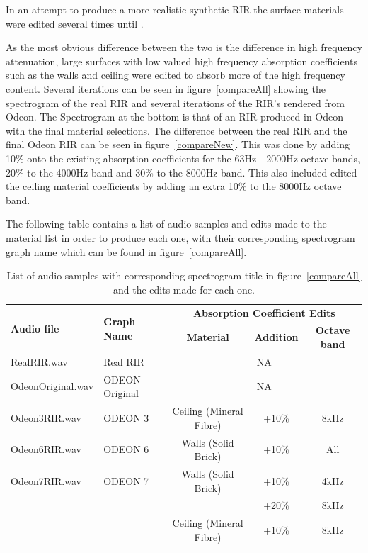 \documentclass[../../main.tex]{subfiles}
\begin{document}
			In an attempt to produce a more realistic synthetic \ac{RIR} the surface materials were edited several times until .

			 As the most obvious difference between the two is the difference in high frequency attenuation, large surfaces with low valued high frequency absorption coefficients such as the walls and ceiling were edited to absorb more of the high frequency content. Several iterations can be seen in figure~\ref{compareAll} showing the spectrogram of the real \ac{RIR} and several iterations of the \ac{RIR}'s rendered from Odeon. The Spectrogram at the bottom is that of an \ac{RIR} produced in Odeon with the final material selections. The difference between the real RIR and the final Odeon \ac{RIR} can be seen in figure~\ref{compareNew}. This was done by adding 10\% onto the existing absorption coefficients for the 63Hz - 2000Hz octave bands, 20\% to the 4000Hz band and 30\% to the 8000Hz band. This also included edited the ceiling material coefficients by adding an extra 10\% to the 8000Hz octave band.

			The following table contains a list of audio samples and edits made to the material list in order to produce each one, with their corresponding spectrogram graph name which can be found in figure~\ref{compareAll}.

			\begin{table}[H]
				\centering
				\begin{tabular}{|l | l | c | c | c |} 
					\hline
					\multirow{2}{*}{\textbf{Audio file}} & \multirow{2}{*}{\textbf{Graph Name}} & \multicolumn{3}{c|}{\textbf{Absorption Coefficient Edits}} \\ \cline{3-5}
					 & & \textbf{Material} & \textbf{Addition} & \textbf{Octave band} \\ \hline
					RealRIR.wav & Real RIR & \multicolumn{3}{c|}{NA}\\ \hline
					OdeonOriginal.wav & ODEON Original & \multicolumn{3}{c|}{NA}\\ \hline
					Odeon3RIR.wav & ODEON 3 & Ceiling (Mineral Fibre) & +10\% & 8kHz\\ \hline
					Odeon6RIR.wav & ODEON 6 & Walls (Solid Brick) & +10\% & All\\ \hline
					Odeon7RIR.wav & ODEON 7 & Walls (Solid Brick) & +10\% & 4kHz\\ 
					& & & +20\% & 8kHz \\
					& & Ceiling (Mineral Fibre) & +10\% & 8kHz\\ \hline
				\end{tabular}
				\caption{List of audio samples with corresponding spectrogram title in figure~\ref{compareAll} and the edits made for each one.}
				\label{materialTable}
			\end{table}
\end{document}
